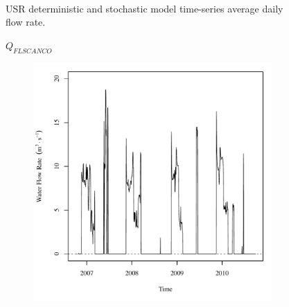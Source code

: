 \begin{linenumbers}
\begin{landscape}
\begin{figure}
\begin{subfigure}{0.7\textwidth}
		\end{subfigure}\\
		\caption{USR deterministic and stochastic model time-series average daily flow rate.}
	\end{figure}
\end{landscape}
\subfiguremid
\begin{landscape}
	\begin{figure}
		\centering
		$ Q_{FLSCANCO} $
		\begin{subfigure}{0.7\textwidth}
			\centering
			\includegraphics[width=\tableCustomSize]{"Figures/Results_USR/Deterministic/Q FLS"}
		\end{subfigure}%
		\begin{subfigure}{0.7\textwidth}
			\centering

\end{subfigure}
\end{figure}
\end{landscape}
\end{linenumbers}
